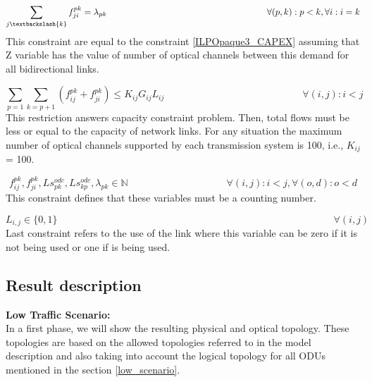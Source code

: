 \begin{equation}
\sum_{j\textbackslash \{k\}} f_{ji}^{pk} = \lambda_{pk}  \qquad \qquad \qquad \qquad \qquad \qquad \qquad \qquad \qquad
\forall(p,k) : p < k, \forall i: i = k
\label{ILPTranslucp8}
\end{equation}
\noindent
This constraint are equal to the constraint \ref{ILPOpaque3_CAPEX} assuming that Z variable has the value of number of optical channels between this demand for all bidirectional links.

\begin{equation}
\sum_{p=1} \sum_{k=p+1} \left( f_{ij}^{pk} + f_{ji}^{pk}\right) \leq K_{ij} G_{ij} L_{ij} \qquad \qquad \qquad \qquad \qquad \qquad \qquad
\forall (i,j) : i < j
\label{ILPTranslucp9}
\end{equation}
\noindent
This restriction answers capacity constraint problem. Then, total flows must be less or equal to the capacity of network links. For any situation the maximum number of optical channels supported by each transmission system is 100, i.e., $K_{ij}$ = 100.

\begin{equation}
f_{ij}^{pk} , f_{ji}^{pk} , Ls_{pk}^{odc} , Ls_{kp}^{odc} , \lambda_{pk} \in \mathbb{N}   \qquad \qquad \qquad \qquad \qquad
\forall(i,j) : i < j, \forall(o,d) : o < d
\label{ILPTranslucp10}
\end{equation}
\noindent
This constraint defines that these variables must be a counting number.

\begin{equation}
L_{i,j} \in \{0,1\} \qquad \qquad \qquad \qquad \qquad \qquad \qquad \qquad \qquad \qquad \qquad \qquad \qquad \qquad
\forall(i,j)
\label{ILPTransluc11}
\end{equation}
\noindent
Last constraint refers to the use of the link where this variable can be zero if it is not being used or one if is being used.

\subsection{Result description}

\textbf{Low Traffic Scenario:}\\

In a first phase, we will show the resulting physical and optical topology. These topologies are based on the allowed topologies referred to in the model description and also taking into account the logical topology for all ODUs mentioned in the section \ref{low_scenario}.

